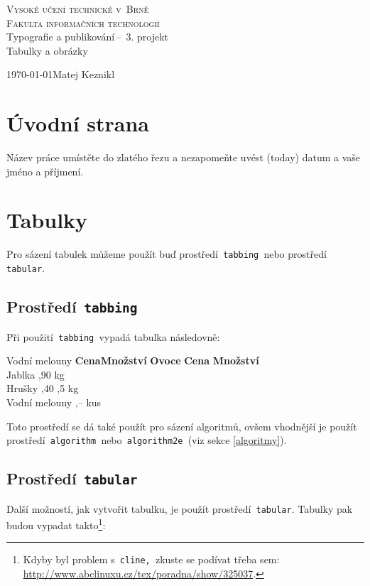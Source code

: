 \documentclass[a4paper, 11pt]{article}
\begin{document}
\begin{titlepage}
	\begin{center} 
		\textsc{\Huge Vysoké učení technické v~Brně\\
			\huge Fakulta informačních technologií \\}
			\LARGE Typografie a publikování\,--\ 3. projekt\\
			\Huge Tabulky a obrázky
			\end{center}
			\Large \today \hfill Matej Keznikl
			\end{titlepage}
						
			\section{Úvodní strana}
			Název práce umístěte do zlatého řezu a nezapomeňte uvést  (today) datum a vaše jméno a příjmení.
						
			\section{Tabulky}
			Pro sázení tabulek můžeme použít buď prostředí\texttt{ tabbing }nebo prostředí\texttt{ tabular}.
						
			\subsection{Prostředí\texttt{ tabbing}}
			Při použití\texttt{ tabbing }vypadá tabulka následovně:
						
			\begin{tabbing}
				Vodní melouny \quad  \=\textbf{Cena}\quad   \=\textbf{Množství}\kill
				\textbf{Ovoce}  \>\textbf{Cena} \>\textbf{Množství}\\
				Jablka          ,90         kg\\
				Hrušky          ,40        ,5 kg\\
				Vodní melouny   ,--         kus\\
			\end{tabbing}
			Toto prostředí se dá také použít pro sázení algoritmů, ovšem vhodnější je použít prostředí\texttt{ algorithm }nebo\texttt{ algorithm2e }(viz sekce \ref{algoritmy}).
						
			\subsection{Prostředí\texttt{ tabular}}
			Další možností, jak vytvořit tabulku, je použít prostředí\texttt{ tabular}. Tabulky pak budou vypadat takto\footnote{Kdyby byl problem s\texttt{ cline, }zkuste se podívat třeba sem: \href{http://www.abclinuxu.cz/tex/poradna/show/325037}{http://www.abclinuxu.cz/tex/poradna/show/325037}.}:
						
\end{document}
